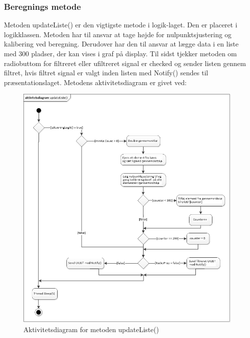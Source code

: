 \subsubsection{Beregnings metode}
Metoden updateListe() er den vigtigste metode i logik-laget. Den er placeret i logikklassen. Metoden har til ansvar at tage højde for nulpunktsjustering og kalibering ved beregning. Derudover har den til ansvar at lægge data i en liste med 300 pladser, der kan vises i graf på display. Til sidst tjekker metoden om radiobuttom for filtreret eller ufiltreret signal er checked og sender listen gennem filtret, hvis filtret signal er valgt inden listen med Notify() sendes til præsentationslaget. Metodens aktivitetsdiagram er givet ved:
\begin{figure}[H]
	\centering
	\includegraphics[width=1.0\textwidth]{Figurer/AktUpdateListe}
	\caption{Aktivitetsdiagram for metoden updateListe()}
\end{figure}

